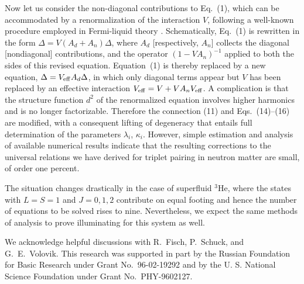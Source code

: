Now let us consider the non-diagonal contributions to Eq.~(1), which 
can be accommodated by a renormalization of the interaction $V$, 
following a well-known procedure employed in Fermi-liquid 
theory \cite{mig}.  Schematically, Eq.~(1) is rewritten in the 
form $\Delta=V(A_d+A_n)\Delta$, where $A_d$ [respectively, $A_n$] 
collects the diagonal [nondiagonal] contributions, 
and the operator $(1-VA_n)^{-1}$ applied to both the 
sides of this revised equation.  Equation~(1) is thereby replaced 
by a new equation, $\Delta=V_{\rm eff}A_d\Delta$, 
in which only diagonal terms appear but $V$ has been replaced 
by an effective interaction $V_{\rm eff}=V+VA_nV_{\rm eff}$.  
A complication is that the structure function $d^2$ of the 
renormalized equation involves higher harmonics and is no longer 
factorizable.  Therefore the connection (11) and Eqs.~(14)--(16) 
are modified, with a consequent lifting of degeneracy that entails 
full determination of the parameters $\lambda_i$, $\kappa_i$.  
However, simple estimation and analysis of available numerical 
results\cite{and} indicate that the resulting corrections 
to the universal relations we have derived for triplet pairing 
in neutron matter are small, of order one percent.

The situation changes drastically in the case of superfluid $^3$He,
where the states with $L=S=1$ and $J=0,1,2$ contribute on 
equal footing and hence the number of equations to be solved rises 
to nine.  Nevertheless, we expect the same methods of analysis 
to prove illuminating for this system as well.

We acknowledge helpful discussions with R.~Fisch, P.~Schuck, and 
G.~E.~Volovik.  This research was supported in part by the Russian 
Foundation for Basic Research under Grant No.~96-02-19292 and by 
the U. S. National Science Foundation under Grant No.~PHY-9602127. 

